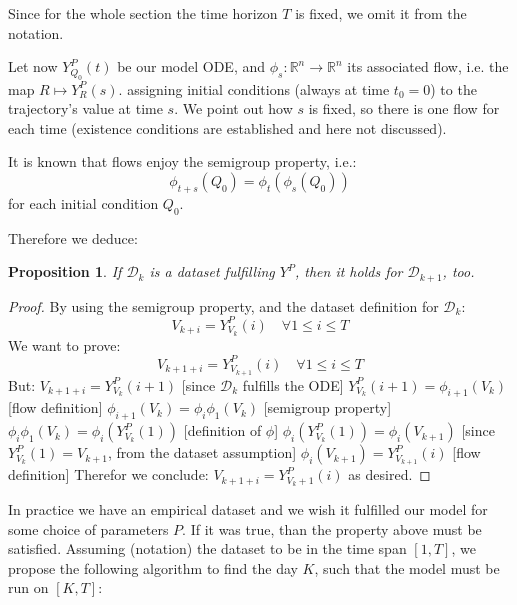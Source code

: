 \documentclass[9pt]{article}
\newtheorem{theorem}{Proposition}
\begin{document}
Since for the whole section the time
horizon $T$ is fixed, we omit it from
the notation.


Let now $Y_{Q_0}^P(t)$ be our model ODE,
and $\phi_s : \mathbb{R}^n \to \mathbb{R}^n$ its associated flow,
i.e. the map $R \mapsto Y_R^P(s)$.
assigning initial conditions (always at time $t_0 = 0$)
to the trajectory's value at time $s$.
We point out how $s$ is fixed, so there is one flow
for each time (existence conditions are established and here not discussed).


It is known that flows enjoy the semigroup property, i.e.:
\begin{equation}
	\phi_{t + s} (Q_0) = \phi_{t} ( \phi_s (Q_0)) 
\end{equation}
for each initial condition $Q_0$.


Therefore we deduce:
\begin{theorem}
	If $\mathcal{D}_k$ is a dataset fulfilling $Y^P$, then it holds for
	$\mathcal{D}_{k+1}$, too.
\end{theorem}

\begin{proof}
	By using the semigroup property, and the dataset definition
	for $\mathcal{D}_k$:
	\begin{equation}
	V_{k + i} = Y_{V_k}^P(i) \quad \forall 1 \leq i \leq T
	\end{equation}
We want to prove:
	\begin{equation}
		V_{k +1 + i} = Y^P_{V_{k+1}} (i) \quad \forall 1 \leq i \leq T 
	\end{equation}
But: 
\newline
	$V_{k + 1 + i} = Y^P_{V_k} (i + 1)$
			[since $\mathcal{D}_k$ fulfills the ODE]
\newline
	$Y^P_{V_k}(i+1) = \phi_{i + 1}(V_k)$ [flow definition]
\newline
	$\phi_{i +1}(V_k) = \phi_i \phi_1 (V_k)$ [semigroup property]
	\newline
	$\phi_i \phi_1 (V_k) = \phi_i (Y^P_{V_k}(1))$ [definition of $\phi$]
	\newline
	$\phi_i (Y^P_{V_k}(1)) = \phi_i(V_{k+1})$ [since 
	$Y^P_{V_k}(1) = V_{k+1}$, from the dataset assumption]
	\newline
	$\phi_i(V_{k+1}) = Y^P_{V_{k+1}}(i)$ [flow definition]
	\newline
	Therefor we conclude: $V_{k + 1 + i} = Y^P_{V_k+1}(i)$
	as desired.
\end{proof}


In practice we have an empirical dataset and we wish it fulfilled our
model for some choice of parameters $P$. If it was true, than the property
above must be satisfied. Assuming (notation) the dataset
to be in the time span $[1,T]$, we propose the following algorithm
to find the day $K$, such that the model must be run on $[K, T]$:
\end{document}
